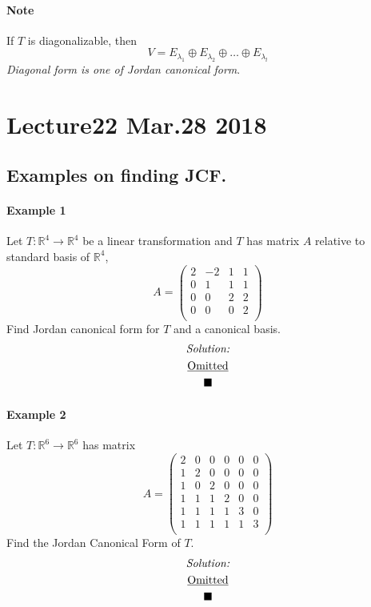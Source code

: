 \documentclass[11pt]{article}
\newcommand{\trans}[3]{{#1}: {#2} \to {#3}}
\newcommand{\R}[0]{\mathbb{R}}
\begin{document}
	\paragraph{Note} If $T$ is diagonalizable, then 
	\[
		V = E_{\lambda_1} \oplus E_{\lambda_2} \oplus \dots \oplus E_{\lambda_l}
	\]
	\emph{Diagonal form is one of Jordan canonical form}.
	
	\section{Lecture22 Mar.28 2018}
	\subsection{Examples on finding JCF.}
	\paragraph{Example 1} Let $\trans{T}{\R^4}{\R^4}$ be a linear transformation and $T$ has matrix $A$ relative to standard basis of $\R^4$,
	\[
	A =
	\begin{pmatrix}
		2 & -2 & 1 & 1 \\
		0 & 1 & 1 & 1 \\
		0 & 0 & 2 & 2 \\
		0 & 0 & 0 & 2 \\
	\end{pmatrix}
	\]
	Find Jordan canonical form for $T$ and a canonical basis.
	\begin{multline*}
		\emph{Solution:}\\
		\underbar{Omitted} \\
		\blacksquare
	\end{multline*}
	
	\paragraph{Example 2} Let $\trans{T}{\R^6}{\R^6}$ has matrix
	\[
		A = 
		\begin{pmatrix}
			2 & 0 & 0 & 0 & 0 & 0 \\
			1 & 2 & 0 & 0 & 0 & 0 \\
			1 & 0 & 2 & 0 & 0 & 0 \\
			1 & 1 & 1 & 2 & 0 & 0 \\
			1 & 1 & 1 & 1 & 3 & 0 \\
			1 & 1 & 1 & 1 & 1 & 3 \\
		\end{pmatrix}
	\] Find the Jordan Canonical Form of $T$.
	\begin{multline*}
		\emph{Solution:}\\
		\underbar{Omitted} \\
		\blacksquare
	\end{multline*}
\end{document}
